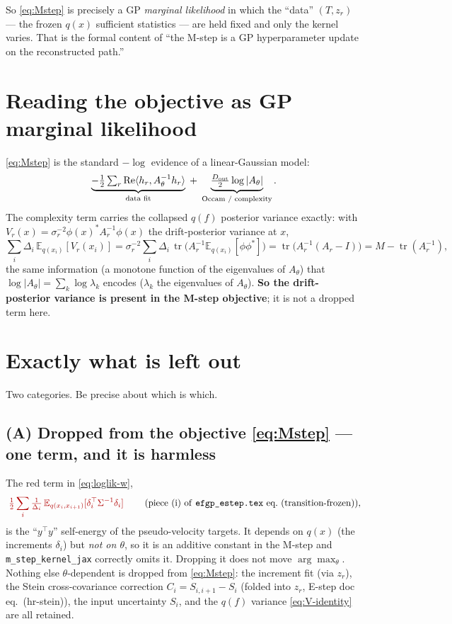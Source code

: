 \documentclass[11pt]{article}
\newcommand{\Eqx}{\mathbb{E}_{q(x_i)}}
\newcommand{\Eqxx}{\mathbb{E}_{q(x_i,x_{i+1})}}
\renewcommand{\Re}{\operatorname{Re}}
\newcommand{\tr}{\operatorname{tr}}
\newcommand{\code}[1]{\texttt{#1}}
\newcommand{\Dt}{D_{\rm out}}
\newcommand{\dropped}[1]{\textcolor{red!70!black}{#1}}
\begin{document}
So \eqref{eq:Mstep} is precisely a GP
\emph{marginal likelihood} in which the ``data'' $(T,z_r)$ --- the frozen $q(x)$
sufficient statistics --- are held fixed and only the kernel varies. That is the
formal content of ``the M-step is a GP hyperparameter update on the reconstructed
path.''

\section{Reading the objective as GP marginal likelihood}
\eqref{eq:Mstep} is the standard $-\log$ evidence of a linear-Gaussian model:
\begin{equation}
\underbrace{-\tfrac12\textstyle\sum_r\Re\langle h_r,A_\theta^{-1}h_r\rangle}_{\text{data fit}}
\;+\;\underbrace{\tfrac{\Dt}{2}\log|A_\theta|}_{\text{Occam / complexity}}.
\end{equation}
The complexity term carries the collapsed $q(f)$ posterior variance exactly: with
$V_r(x)=\sigma_r^{-2}\phi(x)^*A_r^{-1}\phi(x)$ the drift-posterior variance at $x$,
\begin{equation}
\sum_i\Delta_i\,\Eqx[V_r(x_i)]
=\sigma_r^{-2}\sum_i\Delta_i\,\tr\!\big(A_r^{-1}\Eqx[\phi\phi^*]\big)
=\tr\!\big(A_r^{-1}(A_r-I)\big)
=M-\tr(A_r^{-1}),
\label{eq:V-identity}
\end{equation}
the same information (a monotone function of the eigenvalues of $A_\theta$) that
$\log|A_\theta|=\sum_k\log\lambda_k$ encodes ($\lambda_k$ the eigenvalues of $A_\theta$). \textbf{So the drift-posterior
variance is present in the M-step objective}; it is not a dropped term here.

\section{Exactly what is left out}
\label{sec:leftout}
Two categories. Be precise about which is which.

\subsection*{(A) Dropped from the objective \eqref{eq:Mstep} --- one term, and it is harmless}
The \dropped{red} term in \eqref{eq:loglik-w},
\begin{equation}
\dropped{\;\tfrac{1}{2}\sum_i \tfrac{1}{\Delta_i}\,\Eqxx[\delta_i^\top\Sigma^{-1}\delta_i]\;}
\qquad(\text{piece (i) of \texttt{efgp\_estep.tex} eq.~(transition-frozen)}),
\end{equation}
is the ``$y^\top y$'' self-energy of the pseudo-velocity targets. It depends on
$q(x)$ (the increments $\delta_i$) but \emph{not on $\theta$}, so it is an additive
constant in the M-step and \code{m\_step\_kernel\_jax} correctly omits it. Dropping
it does not move $\arg\max_\theta$. Nothing else $\theta$-dependent is dropped from
\eqref{eq:Mstep}: the increment fit (via $z_r$), the Stein cross-covariance
correction $C_i=S_{i,i+1}-S_i$ (folded into $z_r$, E-step doc eq.~(hr-stein)), the
input uncertainty $S_i$, and the $q(f)$ variance \eqref{eq:V-identity} are all
retained.
\end{document}
